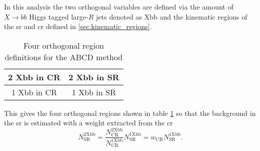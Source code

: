 In this analysis the two orthogonal variables are defined via the amount of $X\rightarrow bb$ Higgs tagged large-$R$ jets denoted as Xbb and the kinematic regions of the \ac{sr} and \ac{cr} defined in \ref{sec:kinematic_regions}.
\begin{table}[htbp]
    \centering
    \caption{Four orthogonal region definitions for the ABCD method}
    \begin{tabular}{|c|c|}
        \hline
        2 Xbb in CR & 2 Xbb in SR \\ \hline
        1 Xbb in CR & 1 Xbb in SR \\ \hline
    \end{tabular}
    \label{tab:abcd}
\end{table}
This gives the four orthogonal regions shown in table \ref{tab:abcd} so that the background in the \ac{sr} is estimated with a weight extracted from the \ac{cr}
\begin{equation}
    N_\text{SR}^\text{2Xbb}=\frac{N_\text{CR}^\text{2Xbb}}{N_\text{CR}^\text{1Xbb}} N_\text{SR}^\text{1Xbb} = w_\text{CR} N_\text{SR}^\text{1Xbb}.
\end{equation}




